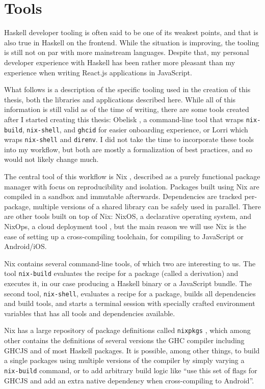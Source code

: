 \documentclass[english,odsaz]{fitthesis}
\begin{document}
\section{Tools}
\label{sec:org3298a39}
Haskell developer tooling is often said to be one of its weakest points, and
that is also true in Haskell on the frontend. While the situation is improving,
the tooling is still not on par with more mainstream languages. Despite that, my
personal developer experience with Haskell has been rather more pleasant than my
experience when writing React.js applications in JavaScript.

What follows is a description of the specific tooling used in the creation of
this thesis, both the libraries and applications described here. While all of
this information is still valid as of the time of writing, there are some tools
created after I started creating this thesis: Obelisk \cite{obelisk}, a
command-line tool that wraps \texttt{nix-build}, \texttt{nix-shell}, and \texttt{ghcid} for easier
onboarding experience, or Lorri \cite{lorri} which wraps \texttt{nix-shell} and \texttt{direnv}. I
did not take the time to incorporate these tools into my workflow, but both are
mostly a formalization of best practices, and so would not likely change much.

The central tool of this workflow is Nix \cite{dolstra2006purely}, described as a
purely functional package manager with focus on reproducibility and
isolation. Packages built using Nix are compiled in a sandbox and immutable
afterwards. Dependencies are tracked per-package, multiple versions of a shared
library can be safely used in parallel. There are other tools built on top of
Nix: NixOS, a declarative operating system, and NixOps, a cloud deployment tool
\cite{dolstra2008nixos}, but the main reason we will use Nix is the ease of
setting up a cross-compiling toolchain, for compiling to JavaScript or
Android/iOS.

Nix contains several command-line tools, of which two are interesting
to us. The tool \texttt{nix-build} evaluates the recipe for a package (called a
derivation) and executes it, in our case producing a Haskell binary or a
JavaScript bundle. The second tool, \texttt{nix-shell}, evaluates a recipe for a package,
builds all dependencies and build tools, and starts a terminal session with
specially crafted environment variables that has all tools and dependencies
available.

Nix has a large repository of package definitions called \texttt{nixpkgs} \cite{nixpkgs},
which among other contains the definitions of several versions the GHC compiler
including GHCJS and of most Haskell packages. It is possible, among other
things, to build a single packages using multiple versions of the compiler by
simply varying a \texttt{nix-build} command, or to add arbitrary build logic like ``use
this set of flags for GHCJS and add an extra native dependency when
cross-compiling to Android''.
\end{document}
